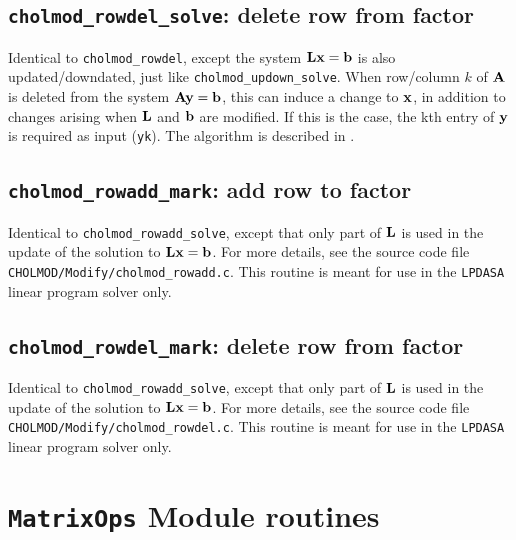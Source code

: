 \documentclass[11pt]{article}
\newcommand{\m}[1]{{\bf{#1}}}       %
\begin{document}
\subsection{{\tt cholmod\_rowdel\_solve}: delete row from factor}


Identical to {\tt cholmod\_rowdel}, except the system $\m{Lx}=\m{b}$ is also updated/downdated, just like {\tt cholmod\_updown\_solve}.
When row/column $k$ of $\m{A}$ is deleted from the system $\m{Ay}=\m{b}$, this can induce
a change to $\m{x}$, in addition to changes arising when $\m{L}$ and $\m{b}$ are modified.
If this is the case, the kth entry of $\m{y}$ is required as input ({\tt yk}).
The algorithm is described in \cite{DavisHager05}.

\newpage \subsection{{\tt cholmod\_rowadd\_mark}: add row to factor}


Identical to {\tt cholmod\_rowadd\_solve}, except that only part of $\m{L}$
is used in the update of the solution to $\m{Lx}=\m{b}$.  For more details,
see the source code file {\tt CHOLMOD/Modify/cholmod\_rowadd.c}.
This routine is meant for use in the {\tt LPDASA} linear program solver only.

\subsection{{\tt cholmod\_rowdel\_mark}: delete row from factor}


Identical to {\tt cholmod\_rowadd\_solve}, except that only part of $\m{L}$
is used in the update of the solution to $\m{Lx}=\m{b}$.  For more details,
see the source code file {\tt CHOLMOD/Modify/cholmod\_rowdel.c}.
This routine is meant for use in the {\tt LPDASA} linear program solver only.

\newpage \section{{\tt MatrixOps} Module routines}
\end{document}
